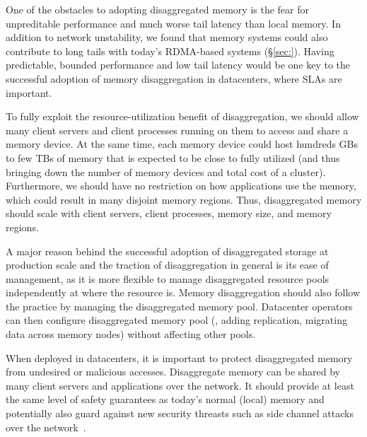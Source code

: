 One of the obstacles to adopting disaggregated memory is the fear for unpreditable performance and much worse tail latency than local memory. %
In addition to network unstability, we found that memory systems could also contribute to long tails with today's RDMA-based systems (\S\ref{sec:}).
Having predictable, bounded performance and low tail latency would be one key to the successful adoption of memory disaggregation in datacenters,
where SLAs are important.

To fully exploit the resource-utilization benefit of disaggregation, we should allow many client servers and client processes running on them to access and share a memory device.
At the same time, each memory device could host hundreds GBs to few TBs of memory that is expected to be close to fully utilized (and thus bringing down the number of 
memory devices and total cost of a cluster).
Furthermore, we should have no restriction on how applications use the memory, which could result in many disjoint memory regions.
Thus, disaggregated memory should scale with client servers, client processes, memory size, and memory regions.

A major reason behind the successful adoption of disaggregated storage at production scale and the traction of disaggregation in general
is its ease of management, as it is more flexible to manage disaggregated resource pools independently at where the resource is.
Memory disaggregation should also follow the practice by managing the disaggregated memory pool.
Datacenter operators can then configure disaggregated memory pool (\eg, adding replication, migrating data across memory nodes)
without affecting other pools.

When deployed in datacenters, it is important to protect disaggregated memory from undesired or malicious accesses.
Disaggregate memory can be shared by many client servers and applications over the network.
It should provide at least the same level of safety guarantees as today's normal (local) memory
and potentially also guard against new security threasts such as side channel attacks over the network~\cite{Tsai19-Security}.

